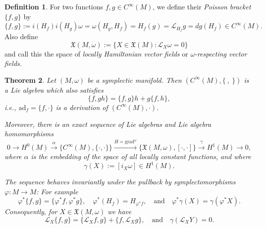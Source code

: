 \documentclass{article}
\newtheorem{theorem}{Theorem}
\numberwithin{theorem}{section}
\theoremstyle{definition}
\newtheorem{definition}[theorem]{Definition}
\begin{document}
\begin{definition}
    For two functions \( f, g \in C^\infty(M) \), we define their \textit{Poisson bracket} \( \{f, g\} \) by
    \begin{equation}
        \{f, g\} := i(H_f)i(H_g)\omega = \omega(H_g, H_f) = H_f(g) = \mathcal{L}_{H_f} g = dg(H_f) \in C^\infty(M).
    \end{equation}
    Also define 
    \begin{equation}
        \mathfrak{X}(M, \omega) := \{ X \in \mathfrak{X}(M) : \mathcal{L}_X \omega = 0 \}
    \end{equation}
    and call this the space of \textit{locally Hamiltonian vector fields} or \(\omega\)-\textit{respecting vector fields}.

\end{definition}


\begin{theorem}
    Let $(M, \omega)$ be a symplectic manifold. Then $(C^\infty(M), \{ \ , \ \})$ is a Lie algebra which also satisfies 
    \[
    \{f, gh\} = \{f, g\}h + g\{f, h\},
    \]
    i.e., $\mathrm{ad}_f = \{f, \cdot\}$ is a derivation of $(C^\infty(M), \cdot)$.

    Moreover, there is an exact sequence of Lie algebras and Lie algebra homomorphisms
    \[
    0 \longrightarrow H^0(M) \xrightarrow{\alpha} \{ C^\infty(M), \{\cdot, \cdot\} \} \xrightarrow{H = \mathrm{grad}^\omega} \{ \mathfrak{X}(M, \omega), [\cdot, \cdot] \} \xrightarrow{\gamma} H^1(M) \longrightarrow 0,
    \]
    where $\alpha$ is the embedding of the space of all locally constant functions, and where 
    \[
    \gamma(X) := [i_X \omega] \in H^1(M).
    \]

    The sequence behaves invariantly under the pullback by symplectomorphisms $\varphi: M \to M$: For example 
    \[
    \varphi^*\{f, g\} = \{\varphi^* f, \varphi^* g\}, \quad \varphi^*(H_f) = H_{\varphi^* f}, \quad \text{and} \quad \varphi^*\gamma(X) = \gamma(\varphi^* X).
    \]
    Consequently, for $X \in \mathfrak{X}(M, \omega)$ we have 
    \[
    \mathcal{L}_X \{f, g\} = \{\mathcal{L}_X f, g\} + \{f, \mathcal{L}_X g\}, \quad \text{and} \quad \gamma(\mathcal{L}_X Y) = 0.
    \]
\end{theorem}
\end{document}
